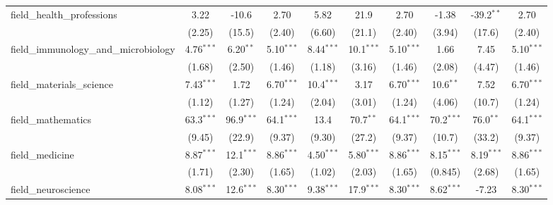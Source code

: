 \begin{tabular}{lccccccccc}
   field\_health\_professions                                  & 3.22          & -10.6         & 2.70          & 5.82          & 21.9          & 2.70          & -1.38         & -39.2$^{**}$  & 2.70\\   
                                                               & (2.25)        & (15.5)        & (2.40)        & (6.60)        & (21.1)        & (2.40)        & (3.94)        & (17.6)        & (2.40)\\   
   field\_immunology\_and\_microbiology                        & 4.76$^{***}$  & 6.20$^{**}$   & 5.10$^{***}$  & 8.44$^{***}$  & 10.1$^{***}$  & 5.10$^{***}$  & 1.66          & 7.45          & 5.10$^{***}$\\   
                                                               & (1.68)        & (2.50)        & (1.46)        & (1.18)        & (3.16)        & (1.46)        & (2.08)        & (4.47)        & (1.46)\\   
   field\_materials\_science                                   & 7.43$^{***}$  & 1.72          & 6.70$^{***}$  & 10.4$^{***}$  & 3.17          & 6.70$^{***}$  & 10.6$^{**}$   & 7.52          & 6.70$^{***}$\\   
                                                               & (1.12)        & (1.27)        & (1.24)        & (2.04)        & (3.01)        & (1.24)        & (4.06)        & (10.7)        & (1.24)\\   
   field\_mathematics                                          & 63.3$^{***}$  & 96.9$^{***}$  & 64.1$^{***}$  & 13.4          & 70.7$^{**}$   & 64.1$^{***}$  & 70.2$^{***}$  & 76.0$^{**}$   & 64.1$^{***}$\\   
                                                               & (9.45)        & (22.9)        & (9.37)        & (9.30)        & (27.2)        & (9.37)        & (10.7)        & (33.2)        & (9.37)\\   
   field\_medicine                                             & 8.87$^{***}$  & 12.1$^{***}$  & 8.86$^{***}$  & 4.50$^{***}$  & 5.80$^{***}$  & 8.86$^{***}$  & 8.15$^{***}$  & 8.19$^{***}$  & 8.86$^{***}$\\   
                                                               & (1.71)        & (2.30)        & (1.65)        & (1.02)        & (2.03)        & (1.65)        & (0.845)       & (2.68)        & (1.65)\\   
   field\_neuroscience                                         & 8.08$^{***}$  & 12.6$^{***}$  & 8.30$^{***}$  & 9.38$^{***}$  & 17.9$^{***}$  & 8.30$^{***}$  & 8.62$^{***}$  & -7.23         & 8.30$^{***}$\\   

\end{tabular}
